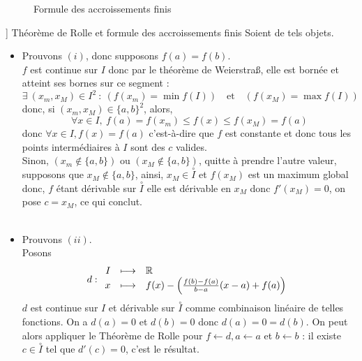 \documentclass{article}
\begin{document}
\begin{question_kholle}
{\begin{enumerate}[label=($\roman*$)]
\begin{figure}[!h]
			      \caption{Formule des accroissements finis}
		      \end{figure}
	\end{enumerate}}
	]
	{Théorème de Rolle et formule des accroissements finis}
	Soient de tels objets. \\
	\begin{itemize}[label=$\bullet$]
		\item
		      Prouvons $(i)$, donc supposons $f(a) = f(b)$. \\
		      $f$ est continue sur $I$ donc par le théorème de Weierstraß, elle est bornée et atteint ses bornes sur ce segment :
		      \\
		      $$\exists \ (x_m, x_M)\in I^2 \ : \ (f(x_m) = \min f(I)) \quad\text{et}\quad (f(x_M) = \max f(I))$$
		      donc, si $(x_m, x_M)\in \{a,b\}^2$, alors,
		      $$\forall x \in I, \ f(a)=f(x_m) \leq f(x) \leq f(x_M)=f(a)$$
		      donc $\forall x \in I, f(x) = f(a)$ c'est-à-dire que $f$ est constante et donc tous les points intermédiaires à $I$ sont des $c$ valides.\\
		      Sinon, $(x_m \notin \{a,b\})$ ou $(x_M \notin \{a,b\}) $, quitte à prendre l'autre valeur, supposons que $x_M \notin \{a,b\}$, ainsi, $x_M \in \overset{\circ}{I}$ et $f(x_M)$ est un maximum global donc, $f$ étant dérivable sur $\overset{\circ}{I}$ elle est dérivable en $x_M$ donc $f'(x_M)=0$, on pose $c = x_M$, ce qui conclut. \\ \\
		\item Prouvons $(ii)$.\\
		      Posons $$d:\begin{array}{rcl}

				      I & \longmapsto & \R \\ x&\longmapsto& f(x) - \left( \frac{f(b)-f(a)}{b-a}(x-a) +f(a) \right)\end{array} $$
		      $d$ est continue sur $I$ et dérivable sur $\overset{\circ}{I}$ comme combinaison linéaire de telles fonctions. On a $d(a) = 0$ et $d(b) = 0$ donc $d(a) = 0 = d(b)$. On peut alors appliquer le Théorème de Rolle pour $f \gets d, a \gets a $ et $ b \gets b$ : il existe $c\in \overset{\circ}{I}$ tel que $d'(c) = 0$, c'est le résultat.
	\end{itemize}
\end{question_kholle}
\end{document}
